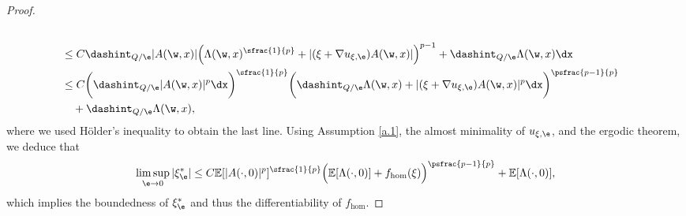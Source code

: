 \begin{proof}
\begin{align*}
\\
&\leq C\dashint_{Q/\e}|A(\w,x)|\Big(\Lambda(\w,x)^{\sfrac{1}{p}}+|(\xi+\nabla u_{\xi,\e})A(\w,x)|\Big)^{p-1}+\dashint_{Q/\e}\Lambda(\w,x)\dx
\\
&\leq C\biggl(\dashint_{Q/\e}|A(\w,x)|^p\dx\biggr)^{\sfrac{1}{p}}\biggl(\dashint_{Q/\e}\Lambda(\w,x)+|(\xi+\nabla u_{\xi,\e})A(\w,x)|^{p}\dx\biggr)^{\psfrac{p-1}{p}}
\\
&\quad+\dashint_{Q/\e}\Lambda(\w,x),
\end{align*}
where we used Hölder's inequality to obtain the last line. Using Assumption \ref{a.1}, the almost minimality of $u_{\xi,\e}$, and the ergodic theorem, we deduce that
\begin{equation*}
\limsup_{\e\to 0}|\xi_{\e}^*|\leq C\mathbb{E}[|A(\cdot,0)|^p]^{\sfrac{1}{p}} \Big(\mathbb{E}[\Lambda(\cdot,0)]+f_{\hom}(\xi)\Big)^{\psfrac{p-1}{p}}+\mathbb{E}[\Lambda(\cdot,0)],
\end{equation*}
which implies the boundedness of $\xi_{\e}^*$ and thus the differentiability of $f_{\hom}$.
\end{proof}

